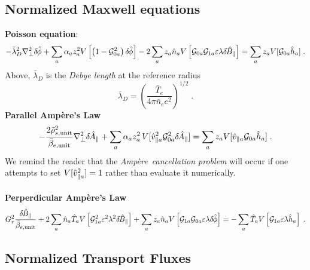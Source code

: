 \subsection{Normalized Maxwell equations}\label{sec.maxwellnorm}

{\bf Poisson equation}:
%
\begin{equation}
-{\bar\lambda}_D^2 \nabla_\perp^2 \delta \hskip -1pt \hat{\phi} + 
\sum_a \alpha_a z_a^2  V \left[ \left(1-{\cal G}_{0a}^2 \right) 
  \delta \hskip -1pt \hat{\phi} \right] 
- 2 \sum_a z_a \hat{n}_a V\left[ {\cal G}_{0a}{\cal G}_{1a} \varepsilon \lambda 
 \delta \hskip -1pt \hat{B}_\parallel \right]
=  \sum_a z_a V[{\cal G}_{0a} \hat{h}_a] \; .
\end{equation}
%
Above, ${\bar\lambda}_D$ is the {\it Debye length} at the reference radius
%
\begin{equation}
{\bar\lambda}_D = \left( \frac{{\bar T}_e}{4\pi {\bar n}_e e^2} \right)^{1/2} 
\; .
\end{equation}
%
{\bf Parallel Amp\`ere's Law}
%
\begin{equation}
-\frac{2\bar{\rho}_{s,{\rm unit}}^2}{\bar{\beta}_{e,{\rm unit}}} \nabla_\perp^2 \delta \hskip -1pt \hat{A}_\parallel + 
\sum_a \alpha_a z_a^2 \, V[\hat{v}_{\parallel a}^2 {\cal G}_{0a}^2 \delta \hskip -1pt \hat{A}_\parallel] = 
 \sum_a z_a V[\hat{v}_{\parallel a} {\cal G}_{0a} \hat{h}_a] \; .
\end{equation}
%
We remind the reader that the {\it Amp\`ere\ cancellation problem} 
\cite{candy:2003} will occur if one attempts to set $V[\hat{v}_{\parallel a}^2]=1$ 
rather than evaluate it numerically.\\
\\
%
{\bf Perperdicular Amp\`ere's Law}
%
\begin{equation}
G_r^2 \frac{\delta \hskip -1pt \hat{B}_\parallel}{\bar{\beta}_{e,{\rm unit}}} 
+ 2 \sum_a \hat{n}_a \hat{T}_a V\left[{\cal G}_{1a}^2 \varepsilon^2 
\lambda^2 \delta \hskip -1pt \hat{B}_\parallel \right]
+ \sum_a z_a \hat{n}_a V \left[ {\cal G}_{1a} {\cal G}_{0a} \varepsilon 
\lambda \delta \hskip -1pt \hat{\phi} \right] 
= - \sum_a \hat{T}_a V\left[ {\cal G}_{1a} \varepsilon \lambda \hat{h}_a \right] \; .
\end{equation}

\subsection{Normalized Transport Fluxes}

